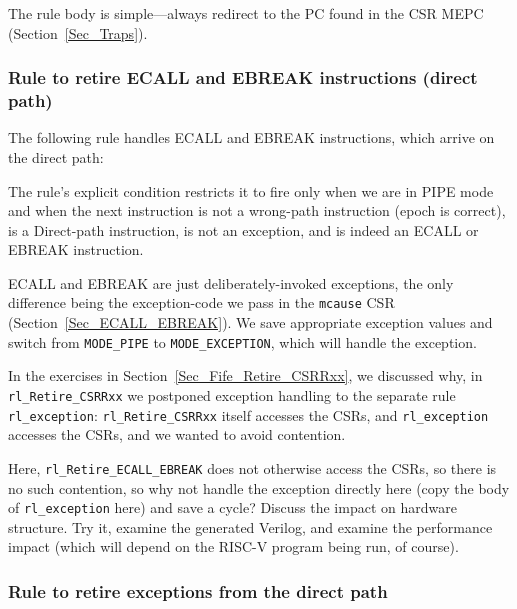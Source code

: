 The rule body is simple---always redirect to the PC found in the CSR
MEPC (Section~\ref{Sec_Traps}).


\subsubsection{Rule to retire ECALL and EBREAK instructions (direct path)}

The following rule handles ECALL and EBREAK instructions, which arrive on the direct path:


The rule's explicit condition restricts it to fire only when we are in
PIPE mode and when the next instruction is not a wrong-path
instruction (epoch is correct), is a Direct-path instruction, is not
an exception, and is indeed an ECALL or EBREAK instruction.

ECALL and EBREAK are just deliberately-invoked exceptions, the only
difference being the exception-code we pass in the \verb|mcause| CSR
(Section~\ref{Sec_ECALL_EBREAK}).  We save appropriate exception
values and switch from \verb|MODE_PIPE| to \verb|MODE_EXCEPTION|,
which will handle the exception.


\Exercise

In the exercises in Section~\ref{Sec_Fife_Retire_CSRRxx}, we discussed
why, in \verb|rl_Retire_CSRRxx| we postponed exception handling to the
separate rule \verb|rl_exception|: \verb|rl_Retire_CSRRxx| itself
accesses the CSRs, and \verb|rl_exception| accesses the CSRs, and we
wanted to avoid contention.

\vspace{1ex}

Here, \verb|rl_Retire_ECALL_EBREAK| does not otherwise access the
CSRs, so there is no such contention, so why not handle the exception
directly here (copy the body of \verb|rl_exception| here) and save a
cycle?  Discuss the impact on hardware structure.  Try it, examine the
generated Verilog, and examine the performance impact (which will
depend on the RISC-V program being run, of course).

\Endexercise


\subsubsection{Rule to retire exceptions from the direct path}

